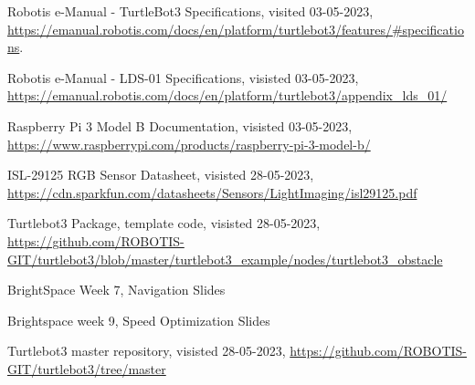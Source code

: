 \documentclass[conference]{IEEEtran}
\begin{document}
\begin{thebibliography}{00}
 \raggedright Robotis e-Manual - TurtleBot3 Specifications, visited 03-05-2023, \url{https://emanual.robotis.com/docs/en/platform/turtlebot3/features/#specifications}.
 \raggedright Robotis e-Manual - LDS-01 Specifications, visisted 03-05-2023, \url{https://emanual.robotis.com/docs/en/platform/turtlebot3/appendix_lds_01/}
 \raggedright Raspberry Pi 3 Model B Documentation, visisted 03-05-2023, \url{https://www.raspberrypi.com/products/raspberry-pi-3-model-b/}
 \raggedright ISL-29125 RGB Sensor Datasheet, visisted 28-05-2023, \url{https://cdn.sparkfun.com/datasheets/Sensors/LightImaging/isl29125.pdf}
 \raggedright Turtlebot3 Package, template code, visisted 28-05-2023, \url{https://github.com/ROBOTIS-GIT/turtlebot3/blob/master/turtlebot3_example/nodes/turtlebot3_obstacle}
 \raggedright BrightSpace Week 7, Navigation Slides
 \raggedright Brightspace week 9, Speed Optimization Slides
 \raggedright Turtlebot3 master repository, visisted 28-05-2023, \url{https://github.com/ROBOTIS-GIT/turtlebot3/tree/master}

\end{thebibliography}
\end{document}
